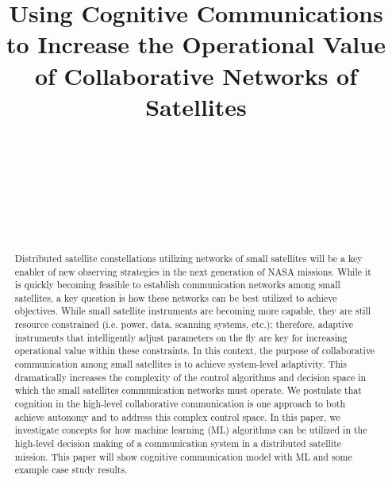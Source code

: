 \documentclass[conference]{IEEEtran}
\title{Using Cognitive Communications to Increase the Operational Value of
  Collaborative Networks of Satellites}
\author{
   \IEEEauthorblockN{Ryan B. Linnabary}
   \IEEEauthorblockA{\thisplace linnabary.24@osu.edu}
   \and
   \IEEEauthorblockN{Andrew J. O'Brien}
   \IEEEauthorblockA{\thisplace obrien.200@osu.edu}
   \and
   \IEEEauthorblockN{Graeme E. Smith}
   \IEEEauthorblockA{\thisplace smith.8347@osu.edu}
   \and
   \IEEEauthorblockN{Christopher Ball}
   \IEEEauthorblockA{\thisplace ball.51@osu.edu}
   \and {~} \and {~~~~~~~~~~~~~~~~} \and
   \IEEEauthorblockN{Joel T. Johnson}
   \IEEEauthorblockA{\thisplace johnson.1374@osu.edu}
   \and {~~~~~~} \and {~~~~~~}
 }
\begin{document}
\maketitle



\begin{abstract}
Distributed satellite constellations utilizing networks of small satellites will be a key enabler of new observing strategies in the next generation of NASA missions.  While it is quickly becoming feasible to establish communication networks among small satellites, a key question is how these networks can be best utilized to achieve objectives.  While small satellite instruments are becoming more capable, they are still resource constrained (i.e. power, data, scanning systems, etc.); therefore, adaptive instruments that intelligently adjust parameters on the fly are key for increasing operational value within these constraints.  In this context, the purpose of collaborative communication among small satellites is to achieve system-level adaptivity.  This dramatically increases the complexity of the control algorithms and decision space in which the small satellites communication networks must operate.  We postulate that cognition in the high-level collaborative communication is one approach to both achieve autonomy and to address this complex control space.  In this paper, we investigate concepts for how machine learning (ML) algorithms can be utilized in the high-level decision making of a communication system in a distributed satellite mission.  This paper will show cognitive communication model with ML and some example case study results.
\end{abstract}
\end{document}
